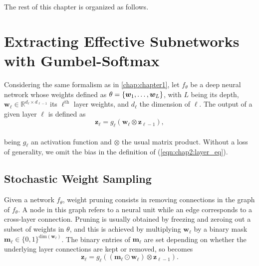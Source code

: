The rest of this chapter is organized as follows.




\section{Extracting Effective Subnetworks with Gumbel-Softmax}

Considering the same formalism as in \cref{chap:chapter1}, let $f_\theta$ be a
deep neural network whose weights defined as $\theta =
\left\{\bm{w}_1,\mathellipsis, \bm{w}_L \right\}$, with $L$ being its depth,
$\bm{w}_\ell \in \mathbb{R}^{d_{\ell} \times d_{\ell-1}}$ its $\ell^\textrm{th}$
layer weights, and $d_\ell$ the dimension of $\ell$. The output of a given layer
$\ell$ is defined as \\

\begin{equation}
  \label{eqn:chap2:layer_eq}
  \mathbf{z}_{\ell} = g_\ell(\bm{w}_\ell \otimes \mathbf{z}_{\ell-1}),
\end{equation}\\

being  $g_\ell$ an activation function and $\otimes$ the usual matrix product.
Without a loss of generality, we omit the bias in the definition of
(\ref{eqn:chap2:layer_eq}).

\subsection{Stochastic Weight Sampling}
\indent Given a network $f_\theta$, weight pruning consists in removing
connections in the graph of $f_\theta$. A node in this graph refers to a
neural unit while an edge corresponds to a cross-layer connection. Pruning is
usually obtained by freezing and zeroing out  a subset of weights in $\theta$,
and this is achieved  by multiplying $\bm{w}_\ell$ by a binary mask
$\bm{m}_\ell \in \{ 0,1 \}^{\text{dim}(\bm{w}_\ell)}$. The
binary entries of $\bm{m}_\ell$ are set depending on whether the underlying
layer connections are kept or removed, so  becomes\\

\begin{equation}
  \label{eqn:chap2:pruned_layer_eq}
  \mathbf{z}_{\ell} = g_\ell( (\bm{m}_\ell \odot \bm{w}_\ell ) \otimes \mathbf{z}_{\ell-1} ).
\end{equation}\\

